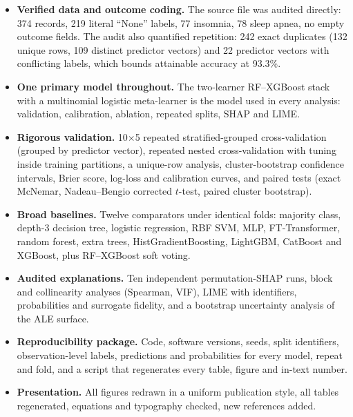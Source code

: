 \documentclass[11pt,a4paper]{article}
\begin{document}
\begin{itemize}
\item \textbf{Verified data and outcome coding.} The source file was audited directly: 374 records, 219 literal ``None'' labels, 77 insomnia, 78 sleep apnea, no empty outcome fields. The audit also quantified repetition: 242 exact duplicates (132 unique rows, 109 distinct predictor vectors) and 22 predictor vectors with conflicting labels, which bounds attainable accuracy at 93.3\%.
\item \textbf{One primary model throughout.} The two-learner RF--XGBoost stack with a multinomial logistic meta-learner is the model used in every analysis: validation, calibration, ablation, repeated splits, SHAP and LIME.
\item \textbf{Rigorous validation.} 10$\times$5 repeated stratified-grouped cross-validation (grouped by predictor vector), repeated nested cross-validation with tuning inside training partitions, a unique-row analysis, cluster-bootstrap confidence intervals, Brier score, log-loss and calibration curves, and paired tests (exact McNemar, Nadeau--Bengio corrected $t$-test, paired cluster bootstrap).
\item \textbf{Broad baselines.} Twelve comparators under identical folds: majority class, depth-3 decision tree, logistic regression, RBF SVM, MLP, FT-Transformer, random forest, extra trees, HistGradientBoosting, LightGBM, CatBoost and XGBoost, plus RF--XGBoost soft voting.
\item \textbf{Audited explanations.} Ten independent permutation-SHAP runs, block and collinearity analyses (Spearman, VIF), LIME with identifiers, probabilities and surrogate fidelity, and a bootstrap uncertainty analysis of the ALE surface.
\item \textbf{Reproducibility package.} Code, software versions, seeds, split identifiers, observation-level labels, predictions and probabilities for every model, repeat and fold, and a script that regenerates every table, figure and in-text number.
\item \textbf{Presentation.} All figures redrawn in a uniform publication style, all tables regenerated, equations and typography checked, new references added.
\end{itemize}
\end{document}

